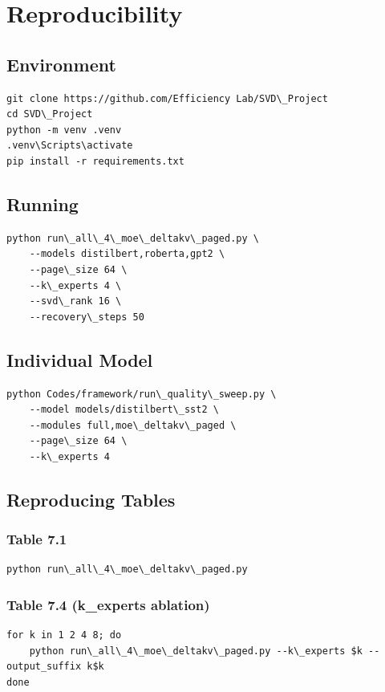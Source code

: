\section{Reproducibility}

\subsection{Environment}

\begin{lstlisting}
git clone https://github.com/Efficiency Lab/SVD\_Project
cd SVD\_Project
python -m venv .venv
.venv\Scripts\activate
pip install -r requirements.txt
\end{lstlisting}

\subsection{Running}

\begin{lstlisting}
python run\_all\_4\_moe\_deltakv\_paged.py \
    --models distilbert,roberta,gpt2 \
    --page\_size 64 \
    --k\_experts 4 \
    --svd\_rank 16 \
    --recovery\_steps 50
\end{lstlisting}

\subsection{Individual Model}

\begin{lstlisting}
python Codes/framework/run\_quality\_sweep.py \
    --model models/distilbert\_sst2 \
    --modules full,moe\_deltakv\_paged \
    --page\_size 64 \
    --k\_experts 4
\end{lstlisting}

\subsection{Reproducing Tables}

\subsubsection{Table 7.1}
\begin{lstlisting}
python run\_all\_4\_moe\_deltakv\_paged.py
\end{lstlisting}

\subsubsection{Table 7.4 (k\_experts ablation)}
\begin{lstlisting}
for k in 1 2 4 8; do
    python run\_all\_4\_moe\_deltakv\_paged.py --k\_experts $k --output_suffix k$k
done
\end{lstlisting}

